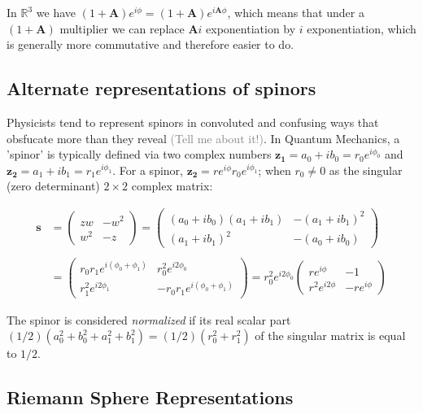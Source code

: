 \documentclass[a4paper]{book}
\numberwithin{equation}{chapter}
\begin{document}
In $\mathbb{R}^3$ we have $(1+\mathbf{A})e^{i\phi}=(1+\mathbf{A})e^{i\mathbf{A}\phi}$,
which means that under a $(1+\mathbf{A})$ multiplier we can replace $\mathbf{A}i$
exponentiation by $i$ exponentiation, which is generally more commutative and therefore
easier to do.

    \subsection{Alternate representations of spinors}

Physicists tend to represent spinors in convoluted and confusing ways that obsfucate more
than they reveal \textcolor{gray}{(Tell me about it!)}. 
In Quantum Mechanics, a 'spinor' is typically defined via two complex
numbers $\mathbf{z_1} = a_0+ib_0 = r_0 e^{i\phi_0}$ and 
$\mathbf{z_2} = a_1+ib_1 = r_1 e^{i\phi_1}$. For a spinor, 
$\mathbf{z_2} = re^{i\phi}r_0e^{i\phi_1}$; when $r_0 \neq 0$ as the singular
(zero determinant) $2\times 2$ complex matrix:

\begin{align*}
    \mathbf{s}
&=
\begin{pmatrix}
  zw& -w^2 \\
  w^2& -z
\end{pmatrix}
=
\begin{pmatrix}
  (a_0+ib_0)(a_1+ib_1)&-(a_1+ib_1)^2 \\
  (a_1+ib_1)^2&-(a_0+ib_0)
\end{pmatrix}
\\
\\
&=
\begin{pmatrix}
 r_0r_1e^{i(\phi_0+\phi_1)}  &  r_0^2 e^{i2\phi_0} \\
  r_1^2 e^{i2\phi_1}  &  -r_0r_1e^{i(\phi_0+\phi_1)}
\end{pmatrix}
=
r_0^2 e^{i2\phi_0}
\begin{pmatrix}
 re^{i\phi}  &  -1 \\
  r^2e^{i2\phi}  &  -re^{i\phi}
\end{pmatrix}
\end{align*}

The spinor is considered \emph{normalized} if its real scalar part 
$(1/2)(a_0^2+b_0^2+a_1^2+b_1^2)=(1/2)(r_0^2+r_1^2)$ of the singular matrix is equal
to $1/2$.


    \subsection{Riemann Sphere Representations}
\end{document}
